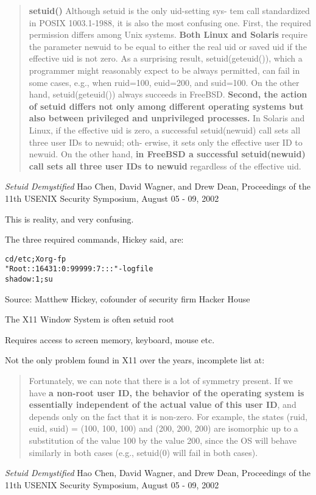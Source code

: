 \documentclass[Screen16to9,17pt]{foils}
\begin{document}

\begin{quote}
{\bf setuid()} Although setuid is the only uid-setting sys-
tem call standardized in POSIX 1003.1-1988, it is also
the most confusing one. First, the required permission
differs among Unix systems. {\bf Both Linux and Solaris}
require the parameter newuid to be equal to either the
real uid or saved uid if the effective uid is not zero. As
a surprising result, setuid(geteuid()), which a programmer might reasonably expect to be always permitted, can fail in some cases, e.g., when ruid=100, euid=200, and
suid=100. On the other hand, setuid(geteuid()) always
succeeds in FreeBSD. {\bf Second, the action of setuid differs not only among different operating systems but also
between privileged and unprivileged processes.} In Solaris and Linux, if the effective uid is zero, a successful
setuid(newuid) call sets all three user IDs to newuid; oth-
erwise, it sets only the effective user ID to newuid. On
the other hand, {\bf in FreeBSD a successful setuid(newuid)
call sets all three user IDs to newuid} regardless of the
effective uid.
\end{quote}
\emph{Setuid Demystified} Hao Chen, David Wagner, and Drew Dean,
Proceedings of the 11th USENIX Security Symposium,
August 05 - 09, 2002

This is reality, and very confusing.


The three required commands, Hickey said, are:
\begin{alltt}
cd /etc; Xorg -fp
"Root::16431:0:99999:7:::" -logfile
shadow  :1;su
\end{alltt}
Source: Matthew Hickey, cofounder of security firm Hacker House

\begin{list2}
\item The X11 Window System is often setuid root
\item Requires access to screen memory, keyboard, mouse etc.
\item Not the only problem found in X11 over the years, incomplete list at:\\
\end{list2}


\begin{quote}
Fortunately, we can note that there is a lot of symmetry present. If we have {\bf a non-root user ID, the behavior of the operating system is essentially independent
of the actual value of this user ID}, and depends only
on the fact that it is non-zero. For example, the states
(ruid, euid, suid) = (100, 100, 100) and (200, 200, 200)
are isomorphic up to a substitution of the value 100 by
the value 200, since the OS will behave similarly in both
cases (e.g., setuid(0) will fail in both cases).
\end{quote}
\emph{Setuid Demystified} Hao Chen, David Wagner, and Drew Dean,
Proceedings of the 11th USENIX Security Symposium,
August 05 - 09, 2002
\end{document}
